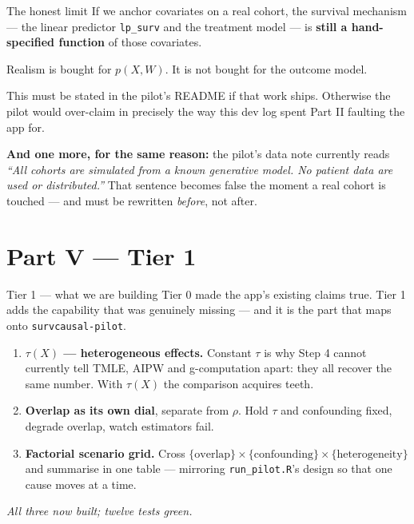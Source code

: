 \documentclass[aspectratio=169]{beamer}
\begin{document}
\begin{frame}{The honest limit}
  \small
  If we anchor covariates on a real cohort, the survival mechanism --- the linear
  predictor \texttt{lp\_surv} and the treatment model --- is \textbf{still a
  hand-specified function} of those covariates.

  \vspace{0.6em}
  Realism is bought for $p(X, W)$. It is not bought for the outcome model.

  \vspace{0.6em}
  This must be stated in the pilot's README if that work ships. Otherwise the pilot
  would over-claim in precisely the way this dev log spent Part II faulting the app for.

  \vspace{0.6em}
  \textbf{And one more, for the same reason:} the pilot's data note currently reads
  \textit{``All cohorts are simulated from a known generative model. No patient data
  are used or distributed.''} That sentence becomes false the moment a real cohort is
  touched --- and must be rewritten \emph{before}, not after.
\end{frame}

\section{Part V --- Tier 1}

\begin{frame}{Tier 1 --- what we are building}
  \small
  Tier 0 made the app's existing claims true. Tier 1 adds the capability that was
  genuinely missing --- and it is the part that maps onto \texttt{survcausal-pilot}.

  \vspace{0.6em}
  \begin{enumerate}
    \item \textbf{$\tau(X)$ --- heterogeneous effects.} Constant $\tau$ is why Step 4
          cannot currently tell TMLE, AIPW and g-computation apart: they all recover
          the same number. With $\tau(X)$ the comparison acquires teeth.
    \item \textbf{Overlap as its own dial}, separate from $\rho$. Hold $\tau$ and
          confounding fixed, degrade overlap, watch estimators fail.
    \item \textbf{Factorial scenario grid.} Cross
          $\{\text{overlap}\} \times \{\text{confounding}\} \times
          \{\text{heterogeneity}\}$ and summarise in one table --- mirroring
          \texttt{run\_pilot.R}'s design so that one cause moves at a time.
  \end{enumerate}

  \vspace{0.5em}
  \small \textit{All three now built; twelve tests green.}
\end{frame}
\end{document}
